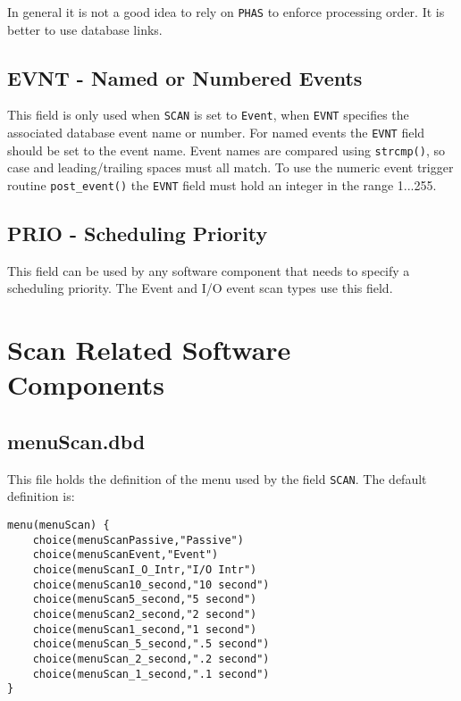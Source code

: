 In general it is not a good idea to rely on \verb|PHAS| to enforce processing order.
It is better to use database links.

\subsection{EVNT - Named or Numbered Events}

This field is only used when \verb|SCAN| is set to \verb|Event|, when \verb|EVNT| specifies the associated database event name or number.
For named events the \verb|EVNT| field should be set to the event name.
Event names are compared using \verb|strcmp()|, so case and leading/trailing spaces must all match.
To use the numeric event trigger routine \verb|post_event()| the \verb|EVNT| field must hold an integer in the range 1...255.

\subsection{PRIO - Scheduling Priority }

This field can be used by any software component that needs to specify a scheduling priority.
The Event and I/O event scan types use this field.

\section{Scan Related Software Components}

\subsection{menuScan.dbd}

This file holds the definition of the menu used by the field \verb|SCAN|.
The default definition is:

\begin{verbatim}
menu(menuScan) {
    choice(menuScanPassive,"Passive")
    choice(menuScanEvent,"Event")
    choice(menuScanI_O_Intr,"I/O Intr")
    choice(menuScan10_second,"10 second")
    choice(menuScan5_second,"5 second")
    choice(menuScan2_second,"2 second")
    choice(menuScan1_second,"1 second")
    choice(menuScan_5_second,".5 second")
    choice(menuScan_2_second,".2 second")
    choice(menuScan_1_second,".1 second")
}
\end{verbatim}

